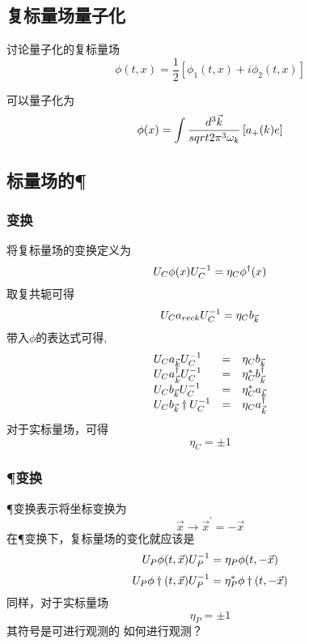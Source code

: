 \subsection{复标量场量子化}
讨论量子化的复标量场
\begin{equation}
    \phi(t, x) = \frac 1  2 [\phi_1(t, x) + i\phi_2(t, x)]
\end{equation}

可以量子化为
\begin{equation}
    \phi(x) = \int \frac{d^3\vec{k}}{sqrt{2\pi^3}\omega_{k}} \left[a_+(k)e\right]
\end{equation}

\subsection{标量场的\C \P \T}
\subsubsection{\C 变换}
将复标量场的\C 变换定义为
\begin{equation}
    U_{C}\phi(x)U_{C}^{-1} = \eta_C\phi^\dagger(x)
\end{equation}
取复共轭可得
\begin{equation}
    U_{C} a_{vec k}U_{C}^{-1} = \eta_C b_{\vec k}
\end{equation}
带入$\phi$的表达式可得,
\begin{equation}
    \begin{array}{lll}
        U_{C} a_{\vec k} U_{C}^{-1} &=& \eta_C b_{\vec k} \\
        U_{C} a_{\vec k}^\dagger U_{C}^{-1} &=& \eta_C^* b_{\vec k}^\dagger \\
        U_{C} b_{\vec k} U_{C}^{-1} &=& \eta_C^* a_{\vec k} \\
        U_{C} b_{\vec k}\dagger U_{C}^{-1} &=& \eta_C a_{\vec k}^\dagger \\
    \end{array}
\end{equation}
对于实标量场，可得
\begin{equation}
    \eta_C = \pm 1
\end{equation}
\subsubsection{\P 变换}
\P 变换表示将坐标变换为
\begin{equation}
    \vec x \rightarrow \vec x^\prime = -\vec x
\end{equation}
在\P 变换下，复标量场的变化就应该是
\begin{equation}
    U_{P}\phi(t,\vec x)U_{P}^{-1} = \eta_P\phi(t,-\vec x)
\end{equation}
\begin{equation}
    U_{P}\phi\dagger(t,\vec x)U_{P}^{-1} = \eta_P^*\phi\dagger(t,-\vec x)
\end{equation}
同样，对于实标量场
\begin{equation}
    \eta_P = \pm 1
\end{equation}
其符号是可进行观测的
如何进行观测？

